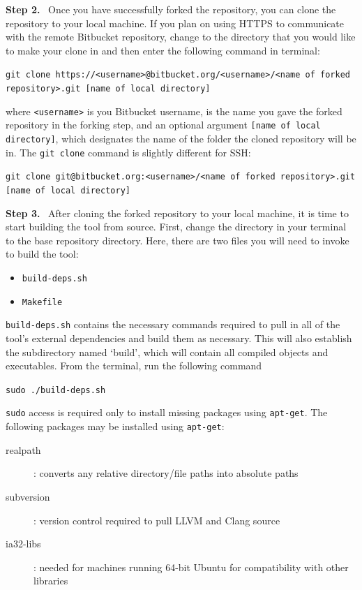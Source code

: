 \documentclass[12pt]{book}
\begin{document}
\noindent \textbf{Step 2.} \ Once you have successfully forked the repository, you can clone the repository to your local machine. If you plan on using HTTPS to communicate with the remote Bitbucket repository, change to the directory that you would like to make your clone in and then enter the following command in terminal:
\begin{center}
	{\tt git clone https://<username>@bitbucket.org/<username>/<name of forked repository>.git [name of local directory]}
\end{center}
where {\tt <username>} is you Bitbucket username, {\tt <name of forked repository>} is the name you gave the forked repository in the forking step, and an optional argument {\tt [name of local directory]}, which designates the name of the folder the cloned repository will be in. The {\tt git clone} command is slightly different for SSH:
\begin{center}
	{\tt git clone git@bitbucket.org:<username>/<name of forked repository>.git [name of local directory]}
\end{center}

\noindent \textbf{Step 3.} \ After cloning the forked repository to your local machine, it is time to start building the tool from source. First, change the directory in your terminal to the base repository directory. Here, there are two files you will need to invoke to build the tool:
\begin{itemize}
	\item {\tt build-deps.sh}
	\item {\tt Makefile}
\end{itemize}

{\tt build-deps.sh} contains the necessary commands required to pull in all of the tool's external dependencies and build them as necessary. This will also establish the subdirectory named `build', which will contain all compiled objects and executables. From the terminal, run the following command
\begin{center}
	{\tt sudo ./build-deps.sh}
\end{center}
{\tt sudo} access is required only to install missing packages using {\tt apt-get}. The following packages may be installed using {\tt apt-get}:
\begin{description}
	\item[realpath]: converts any relative directory/file paths into absolute paths
	\item[subversion]: version control required to pull LLVM and Clang source
	\item[ia32-libs]: needed for machines running 64-bit Ubuntu for compatibility with other libraries
\end{description}
\end{document}
